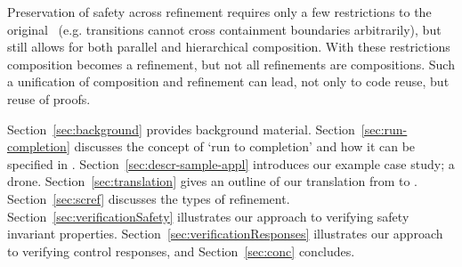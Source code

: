 Preservation of safety across refinement requires only a few restrictions to the original~\cite{Harel} \SCs (e.g. transitions cannot
cross containment boundaries arbitrarily), but still allows for both parallel and hierarchical composition. 
With these restrictions composition becomes a refinement, but not all refinements are compositions.  
Such a unification of composition and refinement can lead, not only to code reuse, but reuse of proofs.

Section~\ref{sec:background} provides background material. Section~\ref{sec:run-completion} discusses the \SC concept of `run to completion' and how it can be specified in \EventB. Section~\ref{sec:descr-sample-appl} introduces our example case study; a drone. Section~\ref{sec:translation} gives an outline of our translation from \SCXML to \EventB. Section~\ref{sec:scref} discusses the types of refinement. Section~\ref{sec:verificationSafety} illustrates our approach to verifying safety invariant properties. Section~\ref{sec:verificationResponses} illustrates our approach to verifying control responses, and Section~\ref{sec:conc} concludes.




